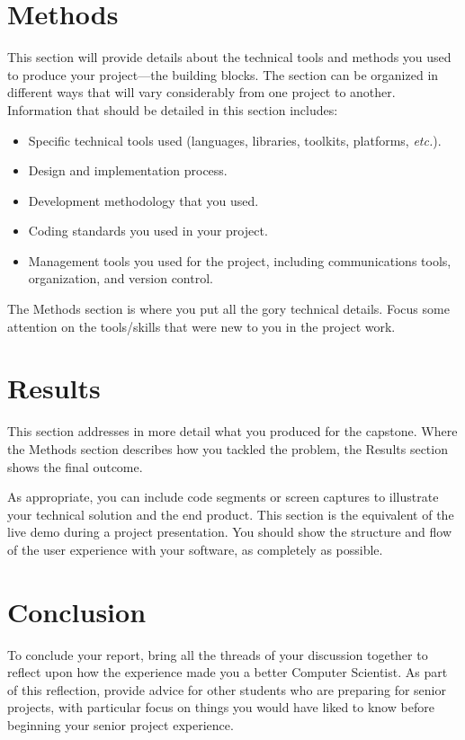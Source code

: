 \documentclass[titlepage]{article}
\begin{document}
\section{Methods}
This section will provide details about the technical tools and methods you used to produce your project---the building blocks. The section can be organized in different ways that will vary considerably from one project to another. Information that should be detailed in this section includes:
\begin{itemize}
\item Specific technical tools used (languages, libraries, toolkits, platforms, \textit{etc.}).
\item Design and implementation process.
\item Development methodology that you used.
\item Coding standards you used in your project.
\item Management tools you used for the project, including communications tools, organization, and version control.
\end{itemize}

The Methods section is where you put all the gory technical details. Focus some attention on the tools/skills that were new to you in the project work.

\section{Results}
This section addresses in more detail what you produced for the capstone. Where the Methods section describes how you tackled the problem, the Results section shows the final outcome. 

As appropriate, you can include code segments or screen captures to illustrate your technical solution and the end product. This section is the equivalent of the live demo during a project presentation. You should show the structure and flow of the user experience with your software, as completely as possible.
 
\section{Conclusion} 
To conclude your report, bring all the threads of your discussion together to reflect upon how the experience made you a better Computer Scientist. As part of this reflection, provide advice for other students who are preparing for senior projects, with particular focus on things you would have liked to know before beginning your senior project experience.
 	


\end{document}
